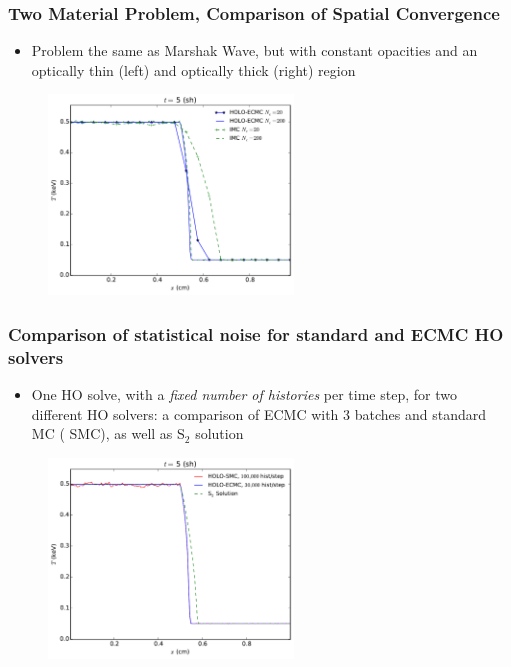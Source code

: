 \documentclass[xcolor=dvipsnames,hyperref={pdfpagelabels=false},unknownkeysallowed]{beamer}
\newcommand{\colb}[1]{{\color{blue} #1}}
\newcommand{\colr}[1]{{\color{red} #1}}
\newlength{\wideitemsep}
\let\olditem\item
\renewcommand{\item}{\setlength{\itemsep}{\wideitemsep}\olditem}
\begin{document}
\begin{frame}
    \frametitle{Two Material Problem, Comparison of Spatial Convergence}
    \begin{block}{}
        \begin{itemize}
            \item Problem the same as Marshak Wave, but with constant opacities and an optically thin (left) and
                optically thick (right) region 
        \end{itemize}
    \end{block}
\begin{figure}
    \centering
    \includegraphics[width=0.5799\textwidth]{two_mat_conv.pdf}
\end{figure}

\end{frame}

\begin{frame}
    \frametitle{Comparison of statistical noise for standard and ECMC HO solvers}
    \begin{block}{}
        {\small
    \begin{itemize}
        \item One HO solve, with a \emph{fixed number of histories} per time step,
            for two different HO solvers: a
            comparison of
            \colr{ECMC} with 3 batches and standard MC (\colb{SMC}), as well as S$_2$
            solution
    \end{itemize}
}
    \end{block}
    \centering
    \begin{figure}
    \includegraphics[width=0.5799\textwidth]{two_mat_ho_compare.pdf}
    \centering
    \end{figure}
\end{frame}
\end{document}
